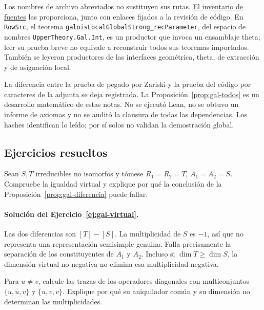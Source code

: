Los nombres de archivo abreviados no sustituyen sus rutas.
\href{https://github.com/lachenmann/riemann-notas/blob/main/fuentes/README.md}{El inventario de fuentes}
las proporciona, junto con enlaces fijados a la revisión de código.
En \texttt{RowSrc}, el teorema
\texttt{galoisLocalGlobalStrong\_recParameter}, del espacio de nombres
\texttt{UpperTheory.Gal.Int}, es un productor que invoca un ensamblaje theta;
leer su prueba breve no equivale a reconstruir todos sus teoremas
importados. También se leyeron productores de las interfaces
geométrica, theta, de extracción y de asignación local.

La diferencia entre la prueba de pegado por Zariski y la prueba
del código por caracteres de la adjunta se deja registrada.
La Proposición~\ref{prop:gal-todos} es un desarrollo matemático
de estas notas. No se ejecutó Lean, no se obtuvo un informe de
axiomas y no se auditó la clausura de todas las dependencias.
Los hashes identifican lo leído; por sí solos no validan
la demostración global.

\subsection{Ejercicios resueltos}

\begin{ejercicio}\label{ej:gal-virtual}
Sean $S,T$ irreducibles no isomorfos y tómese
$R_1=R_2=T$, $A_1=A_2=S$.
Compruebe la igualdad virtual y explique por qué la conclusión
de la Proposición~\ref{prop:gal-diferencia} puede fallar.
\end{ejercicio}

\paragraph{Solución del Ejercicio~\ref{ej:gal-virtual}.}
Las dos diferencias son $[T]-[S]$.
La multiplicidad de $S$ es $-1$, así que no representa una
representación semisimple genuina.
Falla precisamente la separación de los constituyentes de
$A_1$ y $A_2$.
Incluso si $\dim T\ge\dim S$, la dimensión virtual no negativa
no elimina esa multiplicidad negativa.

\begin{ejercicio}\label{ej:gal-anulador}
Para $u\ne v$, calcule las trazas de los operadores diagonales
con multiconjuntos $\{u,u,v\}$ y $\{u,v,v\}$.
Explique por qué su aniquilador común y su dimensión no
determinan las multiplicidades.
\end{ejercicio}


